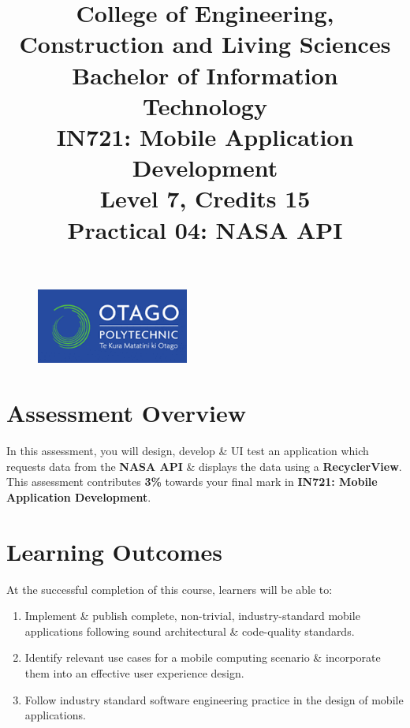 \documentclass{article}
\author{}
\begin{document}
\begin{figure}
    \centering
    \includegraphics[width=50mm]{./img/logo.png}
\end{figure}

\title{College of Engineering, Construction and Living Sciences\\Bachelor of Information Technology\\IN721: Mobile Application Development\\Level 7, Credits 15\\\textbf{Practical 04: NASA API}}
\date{}
\maketitle

\section*{Assessment Overview}
In this assessment, you will design, develop \& UI test an application which requests data from the \textbf{NASA API} \& displays the data using a \textbf{RecyclerView}. This assessment contributes \textbf{3\%} towards your final mark in \textbf{IN721: Mobile Application Development}.

\section*{Learning Outcomes}
At the successful completion of this course, learners will be able to: 
\begin{enumerate}
	\item Implement \& publish complete, non-trivial, industry-standard mobile applications following sound architectural \& code-quality standards.
	\item Identify relevant use cases for a mobile computing scenario \& incorporate them into an effective user experience design.
	\item Follow industry standard software engineering practice in the design of mobile applications.
\end{enumerate} 
\end{document}

